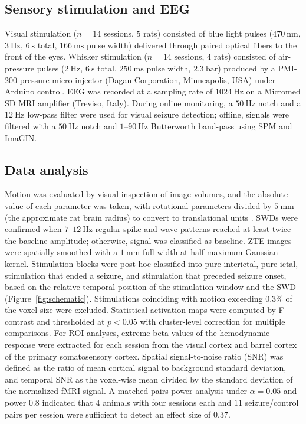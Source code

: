 \documentclass[11pt]{article}
\begin{document}
\subsection{Sensory stimulation and EEG}

Visual stimulation ($n=14$ sessions, $5$ rats) consisted of blue light pulses ($470~\si{\nano\metre}$, $3~\si{\hertz}$, $6~\si{\second}$ total, $166~\si{\milli\second}$ pulse width) delivered through paired optical fibers to the front of the eyes. Whisker stimulation ($n=14$ sessions, $4$ rats) consisted of air-pressure pulses ($2~\si{\hertz}$, $6~\si{\second}$ total, $250~\si{\milli\second}$ pulse width, $2.3~\si{\bar}$) produced by a PMI-200 pressure micro-injector (Dagan Corporation, Minneapolis, USA) under Arduino control. EEG was recorded at a sampling rate of $1024~\si{\hertz}$ on a Micromed SD MRI amplifier (Treviso, Italy). During online monitoring, a $50~\si{\hertz}$ notch and a $12~\si{\hertz}$ low-pass filter were used for visual seizure detection; offline, signals were filtered with a $50~\si{\hertz}$ notch and $1$--$90~\si{\hertz}$ Butterworth band-pass using SPM and ImaGIN.

\subsection{Data analysis}

Motion was evaluated by visual inspection of image volumes, and the absolute value of each parameter was taken, with rotational parameters divided by $5~\si{\milli\metre}$ (the approximate rat brain radius) to convert to translational units \citep{power2012}. SWDs were confirmed when $7$--$12~\si{\hertz}$ regular spike-and-wave patterns reached at least twice the baseline amplitude; otherwise, signal was classified as baseline. ZTE images were spatially smoothed with a $1~\si{\milli\metre}$ full-width-at-half-maximum Gaussian kernel. Stimulation blocks were post-hoc classified into pure interictal, pure ictal, stimulation that ended a seizure, and stimulation that preceded seizure onset, based on the relative temporal position of the stimulation window and the SWD (Figure~\ref{fig:schematic}). Stimulations coinciding with motion exceeding $0.3\%$ of the voxel size were excluded. Statistical activation maps were computed by F-contrast and thresholded at $p<0.05$ with cluster-level correction for multiple comparisons. For ROI analyses, extreme beta-values of the hemodynamic response were extracted for each session from the visual cortex and barrel cortex of the primary somatosensory cortex. Spatial signal-to-noise ratio (SNR) was defined as the ratio of mean cortical signal to background standard deviation, and temporal SNR as the voxel-wise mean divided by the standard deviation of the normalized fMRI signal. A matched-pairs power analysis under $\alpha=0.05$ and power $0.8$ indicated that $4$ animals with four sessions each and $11$ seizure/control pairs per session were sufficient to detect an effect size of $0.37$.
\end{document}
